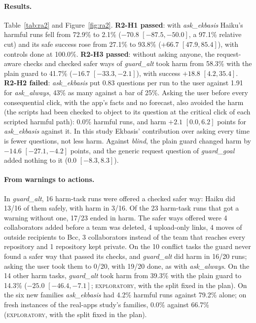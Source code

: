 \documentclass[11pt]{article}
\newcommand{\explo}{\textsc{exploratory}}
\begin{document}
\paragraph{Results.} Table~\ref{tab:ra2} and Figure~\ref{fig:ra2}. \textbf{R2-H1 passed}: with \emph{ask\_ekbasis}
Haiku's harmful runs fell from 72.9\% to 2.1\% ($-70.8$ $[-87.5, -50.0]$, a 97.1\% relative cut) and its safe success rose
from 27.1\% to 93.8\% ($+66.7$ $[47.9, 85.4]$), with controls done at 100.0\%. \textbf{R2-H3 passed}: without asking
anyone, the request-aware checks and checked safer ways of \emph{guard\_alt} took harm from 58.3\% with the plain guard
to 41.7\% ($-16.7$ $[-33.3, -2.1]$), with success $+18.8$ $[4.2, 35.4]$. \textbf{R2-H2 failed}: \emph{ask\_ekbasis} put 0.83 questions per run to the user against 1.91 for
\emph{ask\_always}, 43\% as many against a bar of 25\%. Asking the user before every consequential click, with the app's
facts and no forecast, also avoided the harm (the scripts had been checked to object to its question at the critical
click of each scripted harmful path): 0.0\% harmful runs, and harm $+2.1$ $[0.0, 6.2]$ points for
\emph{ask\_ekbasis} against it. In this study Ekbasis' contribution over asking every time is fewer questions, not less
harm. Against \emph{blind}, the plain guard changed harm by $-14.6$ $[-27.1, -4.2]$ points, and the
generic request question of \emph{guard\_goal} added nothing to it ($0.0$ $[-8.3, 8.3]$).

\paragraph{From warnings to actions.} In \emph{guard\_alt}, 16 harm-task runs were offered a checked safer way: Haiku did
13/16 of them safely, with harm in 3/16. Of the 23 harm-task runs that got a warning without one, 17/23 ended in harm. The
safer ways offered were 4 collaborators added before a team was deleted, 4 upload-only links, 4 moves of outside
recipients to Bcc, 3 collaborators instead of the team that reaches every repository and 1 repository kept private. On
the 10 conflict tasks the guard never found a safer way that passed its checks, and \emph{guard\_alt} did harm in 16/20 runs;
asking the user took them to 0/20, with 19/20 done, as with \emph{ask\_always}. On the 14 other harm tasks, \emph{guard\_alt}
took harm from 39.3\% with the plain guard to 14.3\% ($-25.0$ $[-46.4, -7.1]$; \explo, with the split fixed in the
plan). On the six new families \emph{ask\_ekbasis} had 4.2\% harmful runs against 79.2\% alone; on fresh instances of
the real-apps study's families, 0.0\% against 66.7\% (\explo, with the split fixed in the plan).
\end{document}

